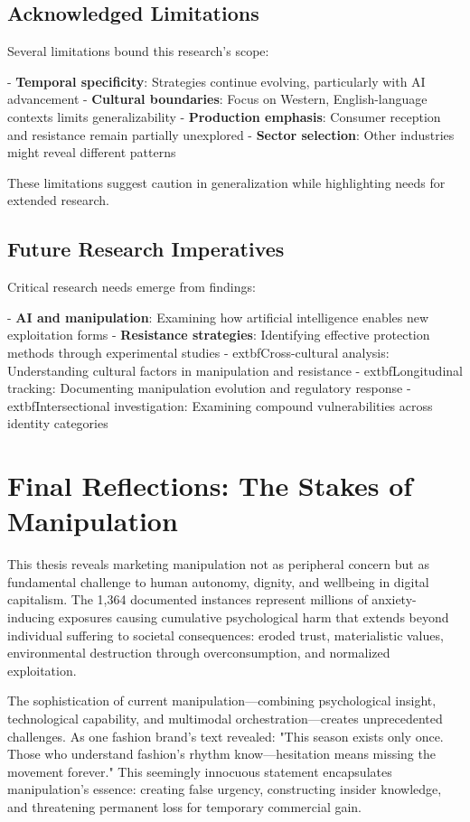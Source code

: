 \subsection{Acknowledged Limitations}

Several limitations bound this research's scope:

- \textbf{Temporal specificity}: Strategies continue evolving, particularly with AI advancement
- \textbf{Cultural boundaries}: Focus on Western, English-language contexts limits generalizability
- \textbf{Production emphasis}: Consumer reception and resistance remain partially unexplored
- \textbf{Sector selection}: Other industries might reveal different patterns

These limitations suggest caution in generalization while highlighting needs for extended research.

\subsection{Future Research Imperatives}

Critical research needs emerge from findings:

- \textbf{AI and manipulation}: Examining how artificial intelligence enables new exploitation forms
- \textbf{Resistance strategies}: Identifying effective protection methods through experimental studies
- 	extbf{Cross-cultural analysis}: Understanding cultural factors in manipulation and resistance
- 	extbf{Longitudinal tracking}: Documenting manipulation evolution and regulatory response
- 	extbf{Intersectional investigation}: Examining compound vulnerabilities across identity categories

\section{Final Reflections: The Stakes of Manipulation}
\label{sec:final_reflections}

This thesis reveals marketing manipulation not as peripheral concern but as fundamental challenge to human autonomy, dignity, and wellbeing in digital capitalism. The 1,364 documented instances represent millions of anxiety-inducing exposures causing cumulative psychological harm that extends beyond individual suffering to societal consequences: eroded trust, materialistic values, environmental destruction through overconsumption, and normalized exploitation.

The sophistication of current manipulation—combining psychological insight, technological capability, and multimodal orchestration—creates unprecedented challenges. As one fashion brand's text revealed: "This season exists only once. Those who understand fashion's rhythm know—hesitation means missing the movement forever." This seemingly innocuous statement encapsulates manipulation's essence: creating false urgency, constructing insider knowledge, and threatening permanent loss for temporary commercial gain.

